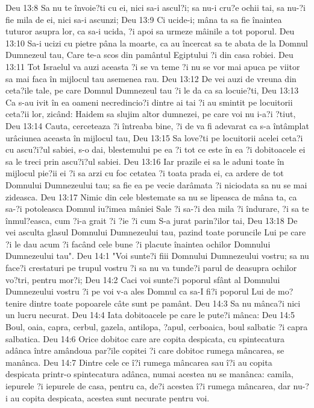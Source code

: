 Deu 13:8  Sa nu te învoie?ti cu ei, nici sa-i ascul?i; sa nu-i cru?e ochii tai, sa nu-?i fie mila de ei, nici sa-i ascunzi;
Deu 13:9  Ci ucide-i; mâna ta sa fie înaintea tuturor asupra lor, ca sa-i ucida, ?i apoi sa urmeze mâinile a tot poporul.
Deu 13:10  Sa-i ucizi cu pietre pâna la moarte, ca au încercat sa te abata de la Domnul Dumnezeul tau, Care te-a scos din pamântul Egiptului ?i din casa robiei.
Deu 13:11  Tot Israelul va auzi aceasta ?i se va teme ?i nu se vor mai apuca pe viitor sa mai faca în mijlocul tau asemenea rau.
Deu 13:12  De vei auzi de vreuna din ceta?ile tale, pe care Domnul Dumnezeul tau ?i le da ca sa locuie?ti,
Deu 13:13  Ca s-au ivit în ea oameni necredincio?i dintre ai tai ?i au smintit pe locuitorii ceta?ii lor, zicând: Haidem sa slujim altor dumnezei, pe care voi nu i-a?i ?tiut,
Deu 13:14  Cauta, cerceteaza ?i întreaba bine, ?i de va fi adevarat ca s-a întâmplat urâciunea aceasta în mijlocul tau,
Deu 13:15  Sa love?ti pe locuitorii acelei ceta?i cu ascu?i?ul sabiei, s-o dai, blestemului pe ea ?i tot ce este în ea ?i dobitoacele ei sa le treci prin ascu?i?ul sabiei.
Deu 13:16  Iar prazile ei sa le aduni toate în mijlocul pie?ii ei ?i sa arzi cu foc cetatea ?i toata prada ei, ca ardere de tot Domnului Dumnezeului tau; sa fie ea pe vecie darâmata ?i niciodata sa nu se mai zideasca.
Deu 13:17  Nimic din cele blestemate sa nu se lipeasca de mâna ta, ca sa-?i potoleasca Domnul iu?imea mâniei Sale ?i sa-?i dea mila ?i îndurare, ?i sa te înmul?easca, cum ?i-a grait ?i ?ie ?i cum S-a jurat parin?ilor tai,
Deu 13:18  De vei asculta glasul Domnului Dumnezeului tau, pazind toate poruncile Lui pe care ?i le dau acum ?i facând cele bune ?i placute înaintea ochilor Domnului Dumnezeului tau".
Deu 14:1  "Voi sunte?i fiii Domnului Dumnezeului vostru; sa nu face?i crestaturi pe trupul vostru ?i sa nu va tunde?i parul de deasupra ochilor vo?tri, pentru mor?i;
Deu 14:2  Caci voi sunte?i poporul sfânt al Domnului Dumnezeului vostru ?i pe voi v-a ales Domnul ca sa-I fi?i poporul Lui de mo?tenire dintre toate popoarele câte sunt pe pamânt.
Deu 14:3  Sa nu mânca?i nici un lucru necurat.
Deu 14:4  Iata dobitoacele pe care le pute?i mânca:
Deu 14:5  Boul, oaia, capra, cerbul, gazela, antilopa, ?apul, cerboaica, boul salbatic ?i capra salbatica.
Deu 14:6  Orice dobitoc care are copita despicata, cu spintecatura adânca între amândoua par?ile copitei ?i care dobitoc rumega mâncarea, se manânca.
Deu 14:7  Dintre cele ce î?i rumega mâncarea sau î?i au copita despicata printr-o spintecatura adânca, numai acestea nu se manânca: camila, iepurele ?i iepurele de casa, pentru ca, de?i acestea î?i rumega mâncarea, dar nu-?i au copita despicata, acestea sunt necurate pentru voi.
